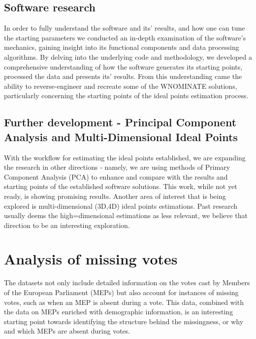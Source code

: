 \documentclass{article}
\begin{document}
    \subsection{Software research}
    In order to fully understand the software and its' results, and how one can tune the starting parameters we
    conducted
    an in-depth examination of the software's mechanics, gaining insight into its functional components and data
    processing algorithms. By delving into the underlying code and methodology, we developed a comprehensive
    understanding of how the software generates its starting points, processed the data and presents its' results.
    From this understanding came the ability to reverse-engineer and recreate some of the WNOMINATE solutions,
    particularly concerning the starting points of the ideal points estimation process.

    \subsection{Further development - Principal Component Analysis and Multi-Dimensional Ideal Points}
    With the workflow for estimating the ideal points established, we are expanding the research in other
    directions - namely, we are using methods of Primary Component Analysis (PCA) to enhance and compare with the
    results and starting points of the established software solutions. This work, while not yet ready, is showing
    promising results. Another area of interest that is being explored is multi-dimensional (3D,4D) ideal points
    estimations. Past research usually deems the high=dimensional estimations as less relevant, we believe that
    direction to be an interesting exploration.


    \section{Analysis of missing votes}

    The datasets not only include detailed information on the votes cast by Members of the European Parliament (MEPs)
    but also account for instances of missing votes, such as when an MEP is absent during a vote. This data,
    combined with the data on MEPs enriched with demographic information, is an interesting starting point towards
    identifying the structure behind the missingness, or why and which MEPs are absent during votes.
\end{document}
